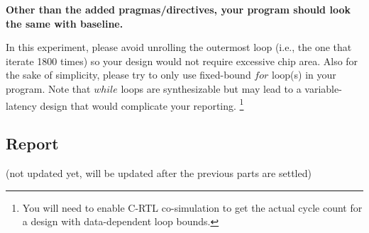 \documentclass[paper=letter, fontsize=10pt]{scrartcl} %
\numberwithin{equation}{section} %
\numberwithin{figure}{section} %
\numberwithin{table}{section} %
\begin{document}
\textbf{Other than the added pragmas/directives, your program should look the same with baseline.}

In this experiment, please avoid unrolling the outermost loop (i.e., the one that iterate 1800 times) so your design would not require excessive chip area. Also for the sake of simplicity, please try to only use fixed-bound $for$ loop(s) in your program. Note that $while$ loops are synthesizable but may lead to a variable-latency design that would  complicate your reporting. \footnote{You will need to enable C-RTL co-simulation to get the actual cycle count for a design with data-dependent loop bounds.} 

\subsection{Report}
(not updated yet, will be updated after the previous parts are settled)
\end{document}
